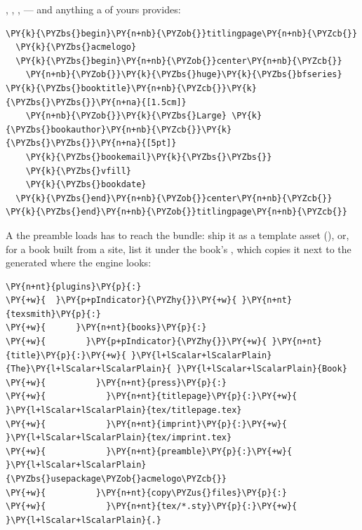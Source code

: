 \documentclass[a4paper,twoside]{article}
\begin{document}
, , ,  --- and anything a
 of yours provides:
\begin{tscode}[lang=latex, engine=pygments]
\begin{Verbatim}[commandchars=\\\{\},breaklines, breakanywhere, commandchars=\\\{\}]
\PY{k}{\PYZbs{}begin}\PY{n+nb}{\PYZob{}}titlingpage\PY{n+nb}{\PYZcb{}}
  \PY{k}{\PYZbs{}acmelogo}
  \PY{k}{\PYZbs{}begin}\PY{n+nb}{\PYZob{}}center\PY{n+nb}{\PYZcb{}}
    \PY{n+nb}{\PYZob{}}\PY{k}{\PYZbs{}huge}\PY{k}{\PYZbs{}bfseries} \PY{k}{\PYZbs{}booktitle}\PY{n+nb}{\PYZcb{}}\PY{k}{\PYZbs{}\PYZbs{}}\PY{n+na}{[1.5cm]}
    \PY{n+nb}{\PYZob{}}\PY{k}{\PYZbs{}Large} \PY{k}{\PYZbs{}bookauthor}\PY{n+nb}{\PYZcb{}}\PY{k}{\PYZbs{}\PYZbs{}}\PY{n+na}{[5pt]}
    \PY{k}{\PYZbs{}bookemail}\PY{k}{\PYZbs{}\PYZbs{}}
    \PY{k}{\PYZbs{}vfill}
    \PY{k}{\PYZbs{}bookdate}
  \PY{k}{\PYZbs{}end}\PY{n+nb}{\PYZob{}}center\PY{n+nb}{\PYZcb{}}
\PY{k}{\PYZbs{}end}\PY{n+nb}{\PYZob{}}titlingpage\PY{n+nb}{\PYZcb{}}
\end{Verbatim}
\end{tscode}
A  the preamble loads has to reach the bundle: ship it as a template
asset (), or, for a book built from a site, list it
under the book's , which copies it next to the generated 
where the engine looks:
\begin{tscode}[lang=yaml, engine=pygments]
\begin{Verbatim}[commandchars=\\\{\},breaklines, breakanywhere, commandchars=\\\{\}]
\PY{n+nt}{plugins}\PY{p}{:}
\PY{+w}{  }\PY{p+pIndicator}{\PYZhy{}}\PY{+w}{ }\PY{n+nt}{texsmith}\PY{p}{:}
\PY{+w}{      }\PY{n+nt}{books}\PY{p}{:}
\PY{+w}{        }\PY{p+pIndicator}{\PYZhy{}}\PY{+w}{ }\PY{n+nt}{title}\PY{p}{:}\PY{+w}{ }\PY{l+lScalar+lScalarPlain}{The}\PY{l+lScalar+lScalarPlain}{ }\PY{l+lScalar+lScalarPlain}{Book}
\PY{+w}{          }\PY{n+nt}{press}\PY{p}{:}
\PY{+w}{            }\PY{n+nt}{titlepage}\PY{p}{:}\PY{+w}{ }\PY{l+lScalar+lScalarPlain}{tex/titlepage.tex}
\PY{+w}{            }\PY{n+nt}{imprint}\PY{p}{:}\PY{+w}{ }\PY{l+lScalar+lScalarPlain}{tex/imprint.tex}
\PY{+w}{            }\PY{n+nt}{preamble}\PY{p}{:}\PY{+w}{ }\PY{l+lScalar+lScalarPlain}{\PYZbs{}usepackage\PYZob{}acmelogo\PYZcb{}}
\PY{+w}{          }\PY{n+nt}{copy\PYZus{}files}\PY{p}{:}
\PY{+w}{            }\PY{n+nt}{tex/*.sty}\PY{p}{:}\PY{+w}{ }\PY{l+lScalar+lScalarPlain}{.}
\end{Verbatim}
\end{tscode}
\end{document}
